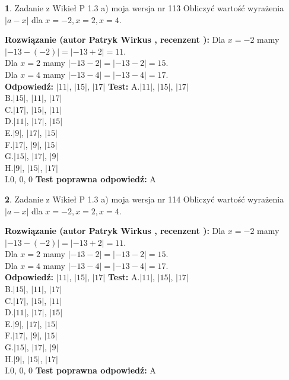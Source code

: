 \documentclass[12pt, a4paper]{article}
\theoremstyle{definition} %
\newtheorem{zad}{}
\newcommand{\zadStart}[1]{\begin{zad}#1\newline}
\newcommand{\zadStop}{\end{zad}}
\newcommand{\rozwStart}[2]{\noindent \textbf{Rozwiązanie (autor #1 , recenzent #2): }\newline}
\newcommand{\rozwStop}{\newline}
\newcommand{\odpStart}{\noindent \textbf{Odpowiedź:}\newline}
\newcommand{\odpStop}{\newline}
\newcommand{\testStart}{\noindent \textbf{Test:}\newline}
\newcommand{\testStop}{\newline}
\newcommand{\kluczStart}{\noindent \textbf{Test poprawna odpowiedź:}\newline}
\newcommand{\kluczStop}{\newline}
\begin{document}
\zadStart{Zadanie z Wikieł P 1.3 a) moja wersja nr 113}
Obliczyć wartość wyrażenia $|a - x|$ dla $x=-2,x=2,x=4$.
\zadStop
\rozwStart{Patryk Wirkus}{}
Dla $x = -2$ mamy $|-13 - (-2)| = |-13 + 2| = 11$.\\
Dla $x = 2$ mamy $|-13 - 2| = |-13 - 2| = 15$.\\
Dla $x = 4$ mamy $|-13 - 4| = |-13 - 4| = 17$.\\
\rozwStop
\odpStart
$|11|$, $|15|$, $|17|$
\odpStop
\testStart
A.$|11|$, $|15|$, $|17|$\\
B.$|15|$, $|11|$, $|17|$\\
C.$|17|$, $|15|$, $|11|$\\
D.$|11|$, $|17|$, $|15|$\\
E.$|9|$, $|17|$, $|15|$\\
F.$|17|$, $|9|$, $|15|$\\
G.$|15|$, $|17|$, $|9|$\\
H.$|9|$, $|15|$, $|17|$\\
I.$0$, $0$, $0$
\testStop
\kluczStart
A
\kluczStop



\zadStart{Zadanie z Wikieł P 1.3 a) moja wersja nr 114}
Obliczyć wartość wyrażenia $|a - x|$ dla $x=-2,x=2,x=4$.
\zadStop
\rozwStart{Patryk Wirkus}{}
Dla $x = -2$ mamy $|-13 - (-2)| = |-13 + 2| = 11$.\\
Dla $x = 2$ mamy $|-13 - 2| = |-13 - 2| = 15$.\\
Dla $x = 4$ mamy $|-13 - 4| = |-13 - 4| = 17$.\\
\rozwStop
\odpStart
$|11|$, $|15|$, $|17|$
\odpStop
\testStart
A.$|11|$, $|15|$, $|17|$\\
B.$|15|$, $|11|$, $|17|$\\
C.$|17|$, $|15|$, $|11|$\\
D.$|11|$, $|17|$, $|15|$\\
E.$|9|$, $|17|$, $|15|$\\
F.$|17|$, $|9|$, $|15|$\\
G.$|15|$, $|17|$, $|9|$\\
H.$|9|$, $|15|$, $|17|$\\
I.$0$, $0$, $0$
\testStop
\kluczStart
A
\kluczStop
\end{document}
